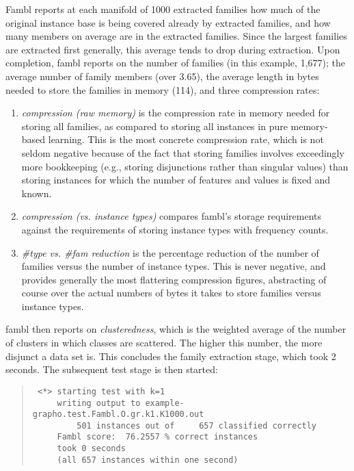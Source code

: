 \documentclass[11pt]{article}
\begin{document}
{\sc Fambl} reports at each manifold of 1000 extracted families
how much of the original instance base is being covered already by
extracted families, and how many members on average are in the
extracted families. Since the largest families are extracted first
generally, this average tends to drop during extraction. Upon
completion, {\sc fambl} reports on the number of families (in this
example, 1,677); the average number of family members (over 3.65),
the average length in bytes needed to store the families in memory
(114), and three compression rates:

\begin{enumerate}

\item
{\em compression (raw memory)} is the compression rate in memory
needed for storing all families, as compared to storing all instances
in pure memory-based learning. This is the most concrete compression
rate, which is not seldom negative because of the fact that storing
families involves exceedingly more bookkeeping (e.g., storing
disjunctions rather than singular values) than storing instances for
which the number of features and values is fixed and known.

\item
{\em compression (vs. instance types)} compares {\sc fambl}'s storage
requirements against the requirements of storing instance types with
frequency counts.

\item
{\em \#type vs. \#fam reduction} is the percentage reduction of the
number of families versus the number of instance types. This is never
negative, and provides generally the most flattering compression
figures, abstracting of course over the actual numbers of bytes it
takes to store families versus instance types.
\end{enumerate}

{\sc fambl} then reports on {\em clusteredness}, which is the weighted
average of the number of clusters in which classes are scattered. The
higher this number, the more disjunct a data set is. This concludes
the family extraction stage, which took 2 seconds. The subsequent test
stage is then started:

\begin{quote}
{\tiny
\begin{verbatim}
 <*> starting test with k=1
     writing output to example-grapho.test.Fambl.O.gr.k1.K1000.out
         501 instances out of     657 classified correctly
     Fambl score:  76.2557 % correct instances
     took 0 seconds
     (all 657 instances within one second)
\end{verbatim}
}
\end{quote}
\end{document}
